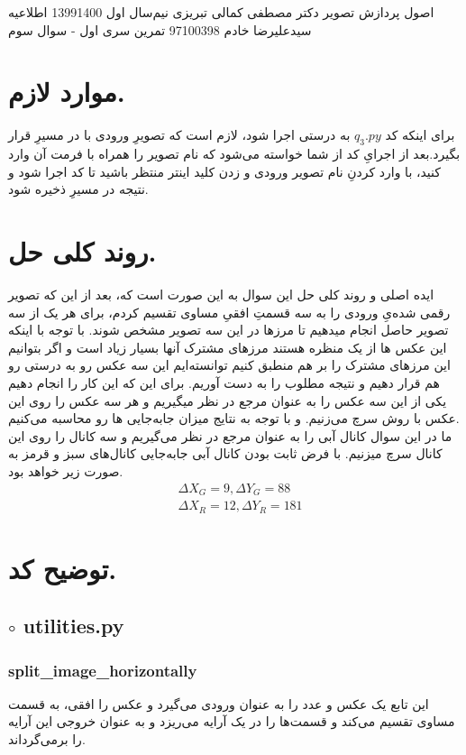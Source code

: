 \documentclass[a4paper,12pt]{article}
\begin{document}
\handout
{اصول پردازش تصویر}
{دکتر مصطفی کمالی تبریزی}
{نیم‌سال اول 1399\lr{-}1400}
{اطلاعیه}
{سیدعلیرضا خادم}
{97100398}
 {تمرین سری اول - سوال سوم}
\section*{موارد لازم.}\label{n}
برای اینکه کد 
$ q_3.py $
به درستی اجرا شود، لازم است که تصویرِ ورودی با در مسیرِ 
قرار بگیرد.بعد از اجرایِ کد از شما خواسته می‌شود که نام تصویر را همراه با فرمت آن وارد کنید، با وارد کردنِ نام تصویر ورودی و زدن کلید اینتر منتظر باشید تا کد اجرا شود و نتیجه در مسیرِ
ذخیره شود.
\section*{روند کلی حل.}
ایده اصلی و روند کلی حل این سوال به این صورت است که، بعد از این که تصویر رقمی شده‌یِ ورودی را به سه قسمتِ افقیِ مساوی تقسیم کردم، برای هر یک از سه تصویر حاصل
انجام میدهیم تا مرزها در این سه تصویر مشخص شوند. با توجه با اینکه این عکس ها از یک منظره هستند مرزهای مشترک آنها  بسیار زیاد است و اگر بتوانیم این مرزهای مشترک را بر هم منطبق کنیم توانسته‌ایم این سه عکس رو به درستی رو هم قرار دهیم و نتیجه مطلوب را به دست آوریم. برای این که این کار را انجام دهیم یکی از این سه عکس را به عنوان مرجع در نظر میگیریم و هر سه عکس را روی این عکس با روش 
سرچ می‌زنیم. و با توجه به نتایج میزان جابه‌جایی ها رو محاسبه می‌کنیم.\\
ما در این سوال کانال آبی را به عنوان مرجع در نظر می‌گیریم و سه کانال را روی این کانال سرچ میزنیم. با فرض ثابت بودن کانال آبی جابه‌جایی کانال‌های سبز و قرمز به صورت زیر خواهد بود.
\begin{align*}
	&\Delta X_G = 9 , \Delta Y_G = 88 \\
	&\Delta X_R = 12 , \Delta Y_R = 181
\end{align*}


\section*{توضیح کد.}
\subsection*{$\circ$ utilities.py}
\subsubsection*{split\_image\_horizontally}
این تابع یک عکس و  عدد
 را به عنوان ورودی می‌گیرد و عکس را افقی، به 
  قسمت مساوی تقسیم می‌کند و  قسمت‌ها را در یک آرایه می‌ریزد و به عنوان خروجی این آرایه را برمی‌گرداند.
\end{document}
